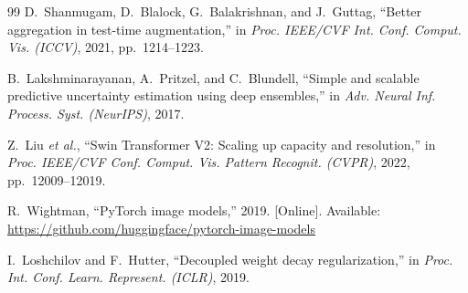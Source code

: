 \documentclass[conference]{IEEEtran}
\begin{document}
\begin{thebibliography}{99}
D.~Shanmugam, D.~Blalock, G.~Balakrishnan, and J.~Guttag, ``Better aggregation in test-time augmentation,'' in \emph{Proc. IEEE/CVF Int. Conf. Comput. Vis. (ICCV)}, 2021, pp.~1214--1223.

B.~Lakshminarayanan, A.~Pritzel, and C.~Blundell, ``Simple and scalable predictive uncertainty estimation using deep ensembles,'' in \emph{Adv. Neural Inf. Process. Syst. (NeurIPS)}, 2017.

Z.~Liu \emph{et al.}, ``Swin Transformer V2: Scaling up capacity and resolution,'' in \emph{Proc. IEEE/CVF Conf. Comput. Vis. Pattern Recognit. (CVPR)}, 2022, pp.~12009--12019.

R.~Wightman, ``PyTorch image models,'' 2019. [Online]. Available: \url{https://github.com/huggingface/pytorch-image-models}

I.~Loshchilov and F.~Hutter, ``Decoupled weight decay regularization,'' in \emph{Proc. Int. Conf. Learn. Represent. (ICLR)}, 2019.

\end{thebibliography}
\end{document}
